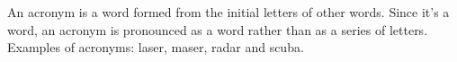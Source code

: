 \documentclass{article}
\begin{document}
An acronym is a word formed from the initial letters of other words. 
Since it's a word, an acronym is pronounced as a word rather than as
a series of letters. Examples of acronyms: \gls{laser}, \gls{maser},
\gls{radar} and \gls{scuba}.

\printglossaries
\end{document}
